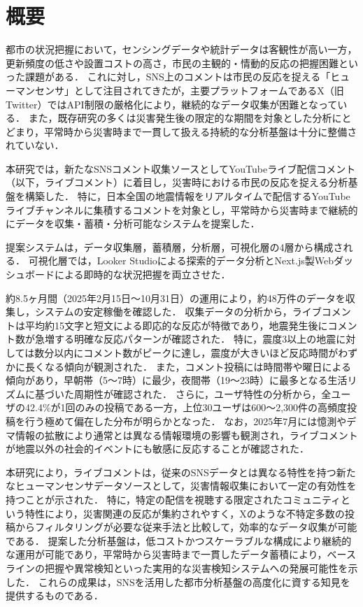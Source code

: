 \chapter*{概要}


都市の状況把握において，センシングデータや統計データは客観性が高い一方，更新頻度の低さや設置コストの高さ，市民の主観的・情動的反応の把握困難といった課題がある．
これに対し，SNS上のコメントは市民の反応を捉える「ヒューマンセンサ」として注目されてきたが，主要プラットフォームであるX（旧Twitter）ではAPI制限の厳格化により，継続的なデータ収集が困難となっている．
また，既存研究の多くは災害発生後の限定的な期間を対象とした分析にとどまり，平常時から災害時まで一貫して扱える持続的な分析基盤は十分に整備されていない．

本研究では，新たなSNSコメント収集ソースとしてYouTubeライブ配信コメント（以下，ライブコメント）に着目し，災害時における市民の反応を捉える分析基盤を構築した．
特に，日本全国の地震情報をリアルタイムで配信するYouTubeライブチャンネルに集積するコメントを対象とし，平常時から災害時まで継続的にデータを収集・蓄積・分析可能なシステムを提案した．

提案システムは，データ収集層，蓄積層，分析層，可視化層の4層から構成される．
可視化層では，Looker Studioによる探索的データ分析とNext.js製Webダッシュボードによる即時的な状況把握を両立させた．

約8.5ヶ月間（2025年2月15日〜10月31日）の運用により，約48万件のデータを収集し，システムの安定稼働を確認した．
収集データの分析から，ライブコメントは平均約15文字と短文による即応的な反応が特徴であり，地震発生後にコメント数が急増する明確な反応パターンが確認された．
特に，震度3以上の地震に対しては数分以内にコメント数がピークに達し，震度が大きいほど反応時間がわずかに長くなる傾向が観測された．
また，コメント投稿には時間帯や曜日による傾向があり，早朝帯（5〜7時）に最少，夜間帯（19〜23時）に最多となる生活リズムに基づいた周期性が確認された．
さらに，ユーザ特性の分析から，全ユーザの42.4\%が1回のみの投稿である一方，上位30ユーザは600〜2,300件の高頻度投稿を行う極めて偏在した分布が明らかとなった．
なお，2025年7月には憶測やデマ情報の拡散により通常とは異なる情報環境の影響も観測され，ライブコメントが地震以外の社会的イベントにも敏感に反応することが確認された．

本研究により，ライブコメントは，従来のSNSデータとは異なる特性を持つ新たなヒューマンセンサデータソースとして，災害情報収集において一定の有効性を持つことが示された．
特に，特定の配信を視聴する限定されたコミュニティという特性により，災害関連の反応が集約されやすく，Xのような不特定多数の投稿からフィルタリングが必要な従来手法と比較して，効率的なデータ収集が可能である．
提案した分析基盤は，低コストかつスケーラブルな構成により継続的な運用が可能であり，平常時から災害時まで一貫したデータ蓄積により，ベースラインの把握や異常検知といった実用的な災害検知システムへの発展可能性を示した．
これらの成果は，SNSを活用した都市分析基盤の高度化に資する知見を提供するものである．
